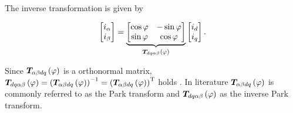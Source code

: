 The inverse transformation is given by

\begin{equation*}
	\begin{bmatrix}
		i_\alpha\\
		i_\beta
	\end{bmatrix}
	=
	\underbrace{
		\begin{bmatrix}
			\cos\varphi & -\sin\varphi\\
			\sin\varphi & \cos\varphi
	\end{bmatrix}}_{\bm{T}_{ d q \alpha \beta}\left(\varphi\right)}
	\begin{bmatrix}
		i_d\\
		i_q
	\end{bmatrix}.
\end{equation*}

Since $\bm{T}_{\alpha \beta d q}\left(\varphi\right)$ is a orthonormal matrix, $\bm{T}_{ d q \alpha \beta}\left(\varphi\right) =\left(\bm{T}_{\alpha \beta d q}\left(\varphi\right)\right)^{-1} = \left(\bm{T}_{\alpha \beta d q}\left(\varphi\right)\right)^{\mathrm{T}}$ holds \cite{KaR2}. In literature $\bm{T}_{\alpha \beta d q}\left(\varphi\right)$ is commonly referred to as the Park transform and $\bm{T}_{ d q \alpha \beta}\left(\varphi\right)$ as the inverse Park transform.


